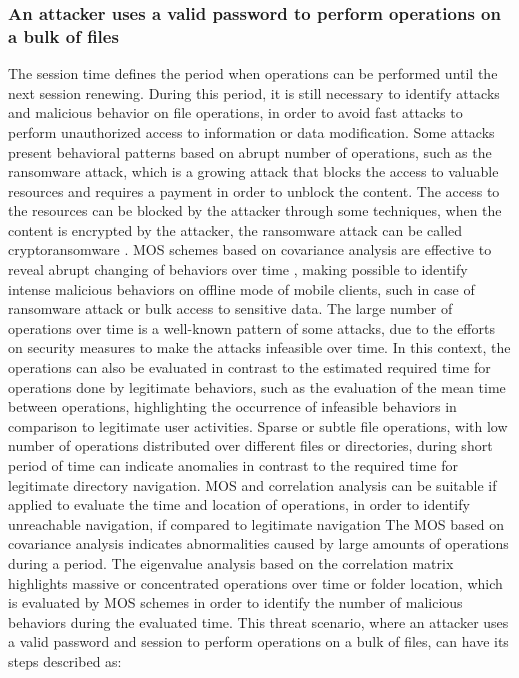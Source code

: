 \documentclass[twocolumn]{svjour3}          %
\begin{document}
\subsubsection{An attacker uses a valid password to perform operations on a bulk of files}
\label{sec_attacker_valid}
The session time defines the period when operations can be performed until the next session renewing. During this period, it is still necessary to identify attacks and malicious behavior on file operations, in order to avoid fast attacks to perform unauthorized access to information or data modification. Some attacks present behavioral patterns based on abrupt number of operations, such as the ransomware attack, which is a growing attack \cite{McAfee2015} that blocks the access to valuable resources and requires a payment in order to unblock the content. The access to the resources can be blocked by the attacker through some techniques, when the content is encrypted by the attacker, the ransomware attack can be called cryptoransomware \cite{kaspersky2014}.
MOS schemes based on covariance analysis are effective to reveal abrupt changing of behaviors over time \cite{tenorio2013greatest}, making possible to identify intense malicious behaviors on offline mode of mobile clients, such in case of ransomware attack or bulk access to sensitive data.
The large number of operations over time is a well-known pattern of some attacks, due to the efforts on security measures to make the attacks infeasible over time. In this context, the operations can also be evaluated in contrast to the estimated required time for operations done by legitimate behaviors, such as the evaluation of the mean time between operations, highlighting the occurrence of infeasible behaviors in comparison to legitimate user activities.
Sparse or subtle file operations, with low number of operations distributed over different files or directories, during short period of time can indicate anomalies in contrast to the required time for legitimate directory navigation. MOS and correlation analysis can be suitable if applied to evaluate the time and location of operations, in order to identify unreachable navigation, if compared to legitimate navigation
The MOS based on covariance analysis indicates abnormalities caused by large amounts of operations during a period. The eigenvalue analysis based on the correlation matrix highlights massive or concentrated operations over time or folder location, which is evaluated by MOS schemes in order to identify the number of malicious behaviors during the evaluated time.
This threat scenario, where an attacker uses a valid password and session to perform operations on a bulk of files, can have its steps described as:
\end{document}
